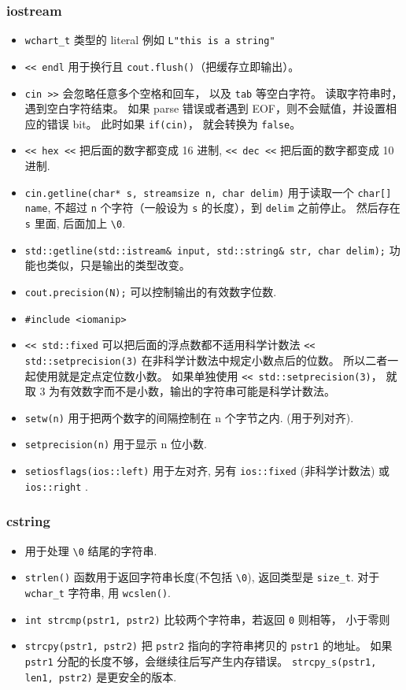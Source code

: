\subsubsection{iostream}
\begin{itemize}
\item \verb`wchart_t` 类型的 literal 例如 \verb`L"this is a string"`
\item \verb`<< endl` 用于换行且 \verb|cout.flush()|（把缓存立即输出）。
\item \verb|cin >>| 会忽略任意多个空格和回车， 以及 \verb|tab| 等空白字符。 读取字符串时，遇到空白字符结束。 如果 parse 错误或者遇到 EOF，则不会赋值，并设置相应的错误 bit。 此时如果 \verb|if(cin)|， 就会转换为 \verb|false|。
\item \verb`<< hex <<` 把后面的数字都变成 16 进制, \verb`<< dec <<` 把后面的数字都变成 10 进制.
\item \verb`cin.getline(char* s, streamsize n, char delim)` 用于读取一个 \verb`char[] name`, 不超过 \verb|n| 个字符（一般设为 \verb|s| 的长度），到 \verb|delim| 之前停止。 然后存在 \verb|s| 里面, 后面加上 \verb`\0`.
\item \verb|std::getline(std::istream& input, std::string& str, char delim);| 功能也类似，只是输出的类型改变。
\item \verb`cout.precision(N);` 可以控制输出的有效数字位数.
\item \verb`#include <iomanip>`
\item \verb|<< std::fixed| 可以把后面的浮点数都不适用科学计数法 \verb|<< std::setprecision(3)| 在非科学计数法中规定小数点后的位数。 所以二者一起使用就是定点定位数小数。 如果单独使用 \verb|<< std::setprecision(3)|， 就取 3 为有效数字而不是小数，输出的字符串可能是科学计数法。
\item \verb`setw(n)` 用于把两个数字的间隔控制在 n 个字节之内. (用于列对齐).
\item \verb`setprecision(n)` 用于显示 n 位小数.
\item \verb`setiosflags(ios::left)` 用于左对齐, 另有 \verb`ios::fixed` (非科学计数法) 或 \verb`ios::right` .
\end{itemize}

\subsubsection{cstring}
\begin{itemize}
\item 用于处理 \verb`\0` 结尾的字符串.
\item \verb`strlen()` 函数用于返回字符串长度(不包括 \verb`\0`), 返回类型是 \verb`size_t`. 对于 \verb`wchar_t` 字符串, 用 \verb`wcslen()`.
\item \verb|int strcmp(pstr1, pstr2)| 比较两个字符串，若返回 \verb|0| 则相等， 小于零则 \verb||
\item \verb`strcpy(pstr1, pstr2)` 把 \verb`pstr2` 指向的字符串拷贝的 \verb`pstr1` 的地址。 如果 \verb|pstr1| 分配的长度不够，会继续往后写产生内存错误。 \verb`strcpy_s(pstr1, len1, pstr2)` 是更安全的版本.
\end{itemize}

